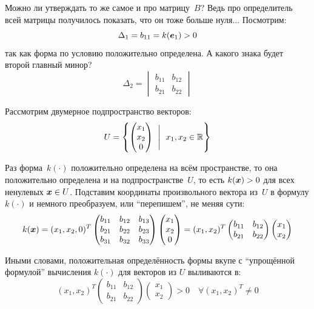 \documentclass[a4paper,12pt]{article}
\begin{document}
\begin{example}
    Можно ли утверждать то же самое и про матрицу~$B$?
    Ведь про определитель всей матрицы получилось показать, что он тоже больше нуля...
    Посмотрим:
    \[
      \Delta_1 = b_{11} = k(\boldsymbol e_1) > 0
    \]
    так как форма по условию положительно определена.
    А какого знака будет второй главный минор?
    \[
      \Delta_2 = \begin{vmatrix}
        b_{11} & b_{12}\\
        b_{21} & b_{22}
      \end{vmatrix}
    \]
    
    Рассмотрим двумерное подпространство векторов:
    \[
      U = \left\{
        \begin{pmatrix}
          x_1\\
          x_2\\
          0
        \end{pmatrix}\ \Biggm|\ x_1, x_2 \in \operatorname{\mathbb R}
      \right\}
    \]
    
    Раз форма~$k(\cdot)$ положительно определена на всём пространстве, то она положительно определена и на подпространстве~$U$, то есть $k(\bds x) \hm> 0$ для всех ненулевых $\bds x \hm\in U$.
    Подставим координаты произвольного вектора из~$U$ в формулу $k(\cdot)$ и немного преобразуем, или ``перепишем'', не меняя сути:
    \[
      k(\boldsymbol x)
      = (x_1, x_2, 0)^T \begin{pmatrix}
        b_{11} & b_{12} & b_{13}\\
        b_{21} & b_{22} & b_{23}\\
        b_{31} & b_{32} & b_{33}
      \end{pmatrix} \begin{pmatrix}
        x_1\\
        x_2\\
        0
      \end{pmatrix}
      = (x_1, x_2)^T \begin{pmatrix}
        b_{11} & b_{12}\\
        b_{21} & b_{22}
      \end{pmatrix} \begin{pmatrix}
        x_1\\
        x_2
      \end{pmatrix}
    \]
    
    Иными словами, положительная определённость формы вкупе с ``упрощённой формулой'' вычисления $k(\cdot)$ для векторов  из $U$ выливаются в:
    \[
      (x_1, x_2)^T \begin{pmatrix}
        b_{11} & b_{12}\\
        b_{21} & b_{22}
      \end{pmatrix} \begin{pmatrix}
        x_1\\
        x_2
      \end{pmatrix} > 0\quad \forall (x_1, x_2)^T \not= 0
    \]
    

\end{example}
\end{document}
